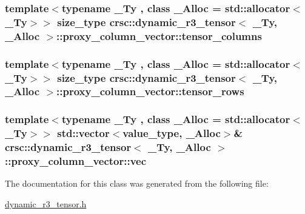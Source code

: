 \subsubsection[{\texorpdfstring{tensor\+\_\+columns}{tensor_columns}}]{\setlength{\rightskip}{0pt plus 5cm}template$<$typename \+\_\+\+Ty , class \+\_\+\+Alloc  = std\+::allocator$<$\+\_\+\+Ty$>$$>$ {\bf size\+\_\+type} {\bf crsc\+::dynamic\+\_\+r3\+\_\+tensor}$<$ \+\_\+\+Ty, \+\_\+\+Alloc $>$\+::proxy\+\_\+column\+\_\+vector\+::tensor\+\_\+columns\hspace{0.3cm}{\ttfamily [private]}}\hypertarget{classcrsc_1_1dynamic__r3__tensor_1_1proxy__column__vector_aa73c1f9df89285bb97e6741fe94c5864}{}\label{classcrsc_1_1dynamic__r3__tensor_1_1proxy__column__vector_aa73c1f9df89285bb97e6741fe94c5864}
\subsubsection[{\texorpdfstring{tensor\+\_\+rows}{tensor_rows}}]{\setlength{\rightskip}{0pt plus 5cm}template$<$typename \+\_\+\+Ty , class \+\_\+\+Alloc  = std\+::allocator$<$\+\_\+\+Ty$>$$>$ {\bf size\+\_\+type} {\bf crsc\+::dynamic\+\_\+r3\+\_\+tensor}$<$ \+\_\+\+Ty, \+\_\+\+Alloc $>$\+::proxy\+\_\+column\+\_\+vector\+::tensor\+\_\+rows\hspace{0.3cm}{\ttfamily [private]}}\hypertarget{classcrsc_1_1dynamic__r3__tensor_1_1proxy__column__vector_a86e5bfd2d8594915b8abd8aafc640277}{}\label{classcrsc_1_1dynamic__r3__tensor_1_1proxy__column__vector_a86e5bfd2d8594915b8abd8aafc640277}
\subsubsection[{\texorpdfstring{vec}{vec}}]{\setlength{\rightskip}{0pt plus 5cm}template$<$typename \+\_\+\+Ty , class \+\_\+\+Alloc  = std\+::allocator$<$\+\_\+\+Ty$>$$>$ std\+::vector$<${\bf value\+\_\+type}, \+\_\+\+Alloc$>$\& {\bf crsc\+::dynamic\+\_\+r3\+\_\+tensor}$<$ \+\_\+\+Ty, \+\_\+\+Alloc $>$\+::proxy\+\_\+column\+\_\+vector\+::vec\hspace{0.3cm}{\ttfamily [private]}}\hypertarget{classcrsc_1_1dynamic__r3__tensor_1_1proxy__column__vector_a8c6eba63e47115cc0ea6134765eab96c}{}\label{classcrsc_1_1dynamic__r3__tensor_1_1proxy__column__vector_a8c6eba63e47115cc0ea6134765eab96c}


The documentation for this class was generated from the following file\+:\begin{DoxyCompactItemize}
\item 
\hyperlink{dynamic__r3__tensor_8h}{dynamic\+\_\+r3\+\_\+tensor.\+h}\end{DoxyCompactItemize}
